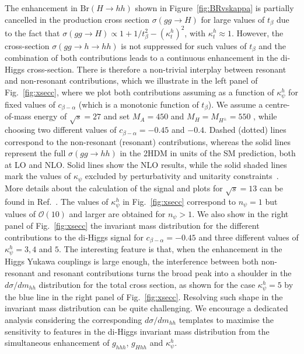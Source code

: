 The enhancement in $\text{Br}(H\to hh)$ shown in Figure~\ref{fig:BRvskappa} is partially cancelled in the production cross section $\sigma(gg\to H)$ for large values of $t_{\beta}$ due to the fact that $\sigma(gg\to H)\propto 1+1/t_\beta^2-(\kappa_t^h)^2$, with $\kappa_t^h \approx 1$. However, the cross-section $\sigma(gg\to h\to hh)$ is not suppressed for such values of $t_{\beta}$ and the combination of both contributions leads to a continuous enhancement in the di-Higgs cross-section. There is therefore a non-trivial interplay between resonant and non-resonant contributions, which we illustrate in the left panel of Fig.~\ref{fig:xsecc}, where we plot both contributions assuming as a function of $\kappa_{\psi}^h$ for fixed values of $c_{\beta-\alpha}$ (which is a monotonic function of $t_{\beta}$). We assume a centre-of-mass energy of $\sqrt{s}=27$ \UTeV and set $M_A=450$ \UGeV and $M_{H}=M_{H^{\pm}}=550$ \UGeV, while choosing two different values of $c_{\beta-\alpha}=-0.45$ and $-0.4$. Dashed (dotted) lines correspond to the non-resonant (resonant) contributions, whereas the solid lines represent the full $\sigma(gg\to hh)$ in the 2HDM in units of the SM prediction, both at LO and NLO.   Solid lines show the NLO results, while the solid shaded lines mark the values of $\kappa_{\psi}$ excluded by perturbativity and unitarity constraints~\cite{Eriksson:2009ws}.  More details about the calculation of the signal and plots for $\sqrt{s}=13$ \UTeV can be found in Ref.~\cite{Bauer:2017cov}.  The values of $\kappa_{\psi}^h$ in Fig.~\ref{fig:xsecc} correspond to $n_{\psi}=1$ but values of $\mathcal{O}(10)$ and larger are obtained for $n_{\psi}>1$. We also show in the right panel of Fig.~\ref{fig:xsecc} the invariant mass distribution for the different contributions to the di-Higgs signal for $c_{\beta-\alpha}=-0.45$ and three different values of $\kappa_{\psi}^{h}=3, 4$ and $5$. The interesting feature is that, when the enhancement in the Higgs Yukawa couplings is large enough, the interference between both non-resonant and resonant contributions turns the broad peak into a shoulder in the $d\sigma/ dm_{hh}$ distribution for the total cross section, as shown for the case $\kappa_{\psi}^h=5$ by the blue line in the right panel of Fig.~\ref{fig:xsecc}. Resolving such shape in the  invariant mass distribution can be quite challenging. We encourage a dedicated analysis considering the corresponding $d\sigma/dm_{hh}$ templates to maximise the sensitivity to features in the di-Higgs invariant mass distribution from the simultaneous enhancement of  $g_{hhh}$, $g_{Hhh}$ and $\kappa^h_{\psi}$.\\


